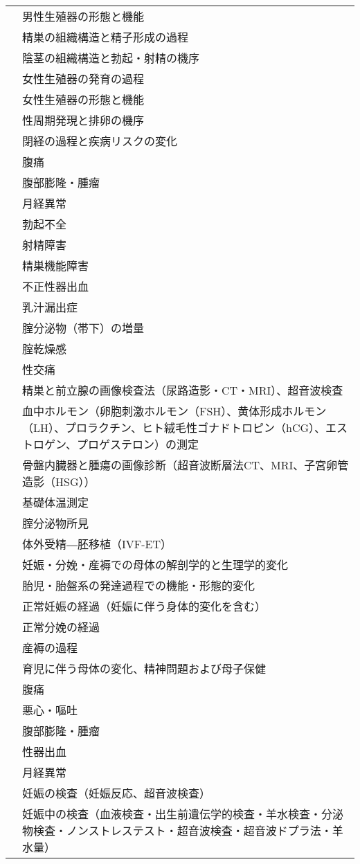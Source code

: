 \begin{xltabular}{\linewidth}{XX}
 & 男性生殖器の形態と機能 \\
 & 精巣の組織構造と精子形成の過程 \\
 & 陰茎の組織構造と勃起・射精の機序 \\
 & 女性生殖器の発育の過程 \\
 & 女性生殖器の形態と機能 \\
 & 性周期発現と排卵の機序 \\
 & 閉経の過程と疾病リスクの変化 \\
 & 腹痛 \\
 & 腹部膨隆・腫瘤 \\
 & 月経異常 \\
 & 勃起不全 \\
 & 射精障害 \\
 & 精巣機能障害 \\
 & 不正性器出血 \\
 & 乳汁漏出症 \\
 & 腟分泌物（帯下）の増量 \\
 & 腟乾燥感 \\
 & 性交痛 \\
 & 精巣と前立腺の画像検査法（尿路造影・CT・MRI）、超音波検査 \\
 & 血中ホルモン（卵胞刺激ホルモン（FSH）、黄体形成ホルモン（LH）、プロラクチン、ヒト絨毛性ゴナドトロピン（hCG）、エストロゲン、プロゲステロン）の測定 \\
 & 骨盤内臓器と腫瘍の画像診断（超音波断層法CT、MRI、子宮卵管造影（HSG）） \\
 & 基礎体温測定 \\
 & 腟分泌物所見 \\
 & 体外受精―胚移植（IVF-ET） \\
 & 妊娠・分娩・産褥での母体の解剖学的と生理学的変化 \\
 & 胎児・胎盤系の発達過程での機能・形態的変化 \\
 & 正常妊娠の経過（妊娠に伴う身体的変化を含む） \\
 & 正常分娩の経過 \\
 & 産褥の過程 \\
 & 育児に伴う母体の変化、精神問題および母子保健 \\
 & 腹痛 \\
 & 悪心・嘔吐 \\
 & 腹部膨隆・腫瘤 \\
 & 性器出血 \\
 & 月経異常 \\
 & 妊娠の検査（妊娠反応、超音波検査） \\
 & 妊娠中の検査（血液検査・出生前遺伝学的検査・羊水検査・分泌物検査・ノンストレステスト・超音波検査・超音波ドプラ法・羊水量） \\

\end{xltabular}
